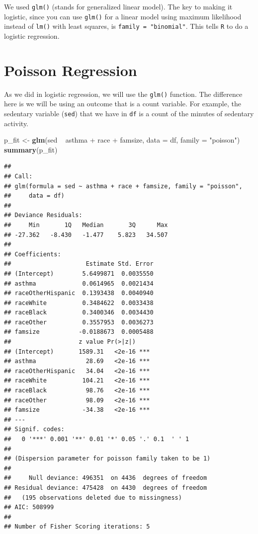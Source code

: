 \documentclass[]{tufte-book}
\newenvironment{Shaded}{}{}
\newcommand{\KeywordTok}[1]{\textcolor[rgb]{0.00,0.44,0.13}{\textbf{#1}}}
\newcommand{\DataTypeTok}[1]{\textcolor[rgb]{0.56,0.13,0.00}{#1}}
\newcommand{\StringTok}[1]{\textcolor[rgb]{0.25,0.44,0.63}{#1}}
\newcommand{\OperatorTok}[1]{\textcolor[rgb]{0.40,0.40,0.40}{#1}}
\newcommand{\NormalTok}[1]{#1}
\theoremstyle{definition}
\theoremstyle{definition}
\theoremstyle{remark}
\begin{document}
We used \texttt{glm()} (stands for generalized linear model). The key to
making it logistic, since you can use \texttt{glm()} for a linear model
using maximum likelihood instead of \texttt{lm()} with least squares, is
\texttt{family\ =\ "binomial"}. This tells \texttt{R} to do a logistic
regression.

\section*{Poisson Regression}\label{poisson-regression}

As we did in logistic regression, we will use the \texttt{glm()}
function. The difference here is we will be using an outcome that is a
count variable. For example, the sedentary variable (\texttt{sed}) that
we have in \texttt{df} is a count of the minutes of sedentary activity.

\begin{Shaded}
\begin{Highlighting}[]
\NormalTok{p_fit <-}\StringTok{ }\KeywordTok{glm}\NormalTok{(sed }\OperatorTok{~}\StringTok{ }\NormalTok{asthma }\OperatorTok{+}\StringTok{ }\NormalTok{race }\OperatorTok{+}\StringTok{ }\NormalTok{famsize, }\DataTypeTok{data =}\NormalTok{ df, }
    \DataTypeTok{family =} \StringTok{"poisson"}\NormalTok{)}
\KeywordTok{summary}\NormalTok{(p_fit)}
\end{Highlighting}
\end{Shaded}

\begin{verbatim}
## 
## Call:
## glm(formula = sed ~ asthma + race + famsize, family = "poisson", 
##     data = df)
## 
## Deviance Residuals: 
##     Min       1Q   Median       3Q      Max  
## -27.362   -8.430   -1.477    5.823   34.507  
## 
## Coefficients:
##                     Estimate Std. Error
## (Intercept)        5.6499871  0.0035550
## asthma             0.0614965  0.0021434
## raceOtherHispanic  0.1393438  0.0040940
## raceWhite          0.3484622  0.0033438
## raceBlack          0.3400346  0.0034430
## raceOther          0.3557953  0.0036273
## famsize           -0.0188673  0.0005488
##                   z value Pr(>|z|)    
## (Intercept)       1589.31   <2e-16 ***
## asthma              28.69   <2e-16 ***
## raceOtherHispanic   34.04   <2e-16 ***
## raceWhite          104.21   <2e-16 ***
## raceBlack           98.76   <2e-16 ***
## raceOther           98.09   <2e-16 ***
## famsize            -34.38   <2e-16 ***
## ---
## Signif. codes:  
##   0 '***' 0.001 '**' 0.01 '*' 0.05 '.' 0.1  ' ' 1
## 
## (Dispersion parameter for poisson family taken to be 1)
## 
##     Null deviance: 496351  on 4436  degrees of freedom
## Residual deviance: 475428  on 4430  degrees of freedom
##   (195 observations deleted due to missingness)
## AIC: 508999
## 
## Number of Fisher Scoring iterations: 5
\end{verbatim}
\end{document}
